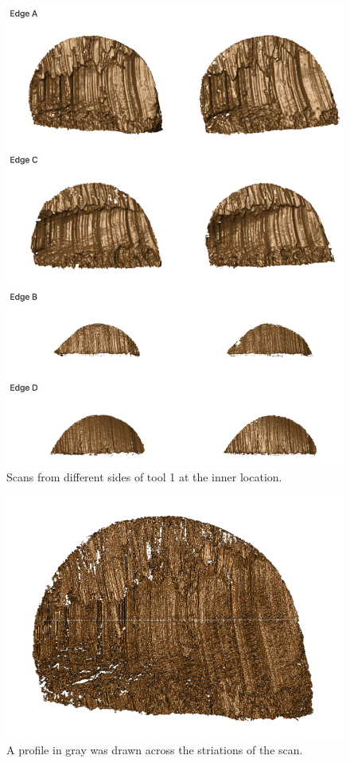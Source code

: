 \documentclass[fleqn,10pt]{wlscirep}
\begin{document}
\begin{figure}[ht]
\centering
\includegraphics[width=0.8\linewidth]{scans_pair.png}
\caption{Scans from different sides of tool 1 at the inner location.}
\label{fig: scans_pair}
\end{figure}

\begin{figure}[ht]
\centering
\includegraphics[width=0.5\linewidth]{T1AW-LI-R1-profiles.png}
\caption{A profile in gray was drawn across the striations of the scan.}
\label{fig: T1AW-LI-R1-profiles}
\end{figure}
\end{document}
